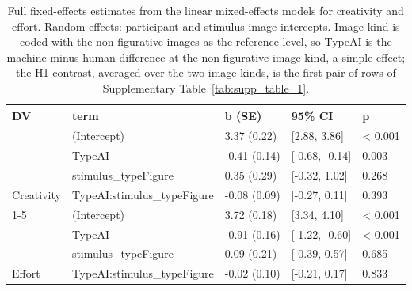 \begin{table}[!h]
\centering
\caption{\label{tab:supp_lmm}Full fixed-effects estimates from the linear mixed-effects models for creativity and effort. Random effects: participant and stimulus image intercepts. Image kind is coded with the non-figurative images as the reference level, so TypeAI is the machine-minus-human difference at the non-figurative image kind, a simple effect; the H1 contrast, averaged over the two image kinds, is the first pair of rows of Supplementary Table~\ref{tab:supp_table_1}.}
\centering
\fontsize{9}{11}\selectfont
\begin{tabular}[t]{lllll}
\toprule
DV & term & b (SE) & 95\% CI & p\\
\midrule
 & (Intercept) & 3.37 (0.22) & {}[2.88, 3.86] & < 0.001\\

 & TypeAI & -0.41 (0.14) & {}[-0.68, -0.14] & 0.003\\

 & stimulus\_typeFigure & 0.35 (0.29) & {}[-0.32, 1.02] & 0.268\\

\multirow{-4}{*}{\raggedright\arraybackslash Creativity} & TypeAI:stimulus\_typeFigure & -0.08 (0.09) & {}[-0.27, 0.11] & 0.393\\
\cmidrule{1-5}
 & (Intercept) & 3.72 (0.18) & {}[3.34, 4.10] & < 0.001\\

 & TypeAI & -0.91 (0.16) & {}[-1.22, -0.60] & < 0.001\\

 & stimulus\_typeFigure & 0.09 (0.21) & {}[-0.39, 0.57] & 0.685\\

\multirow{-4}{*}{\raggedright\arraybackslash Effort} & TypeAI:stimulus\_typeFigure & -0.02 (0.10) & {}[-0.21, 0.17] & 0.833\\
\bottomrule
\end{tabular}
\end{table}